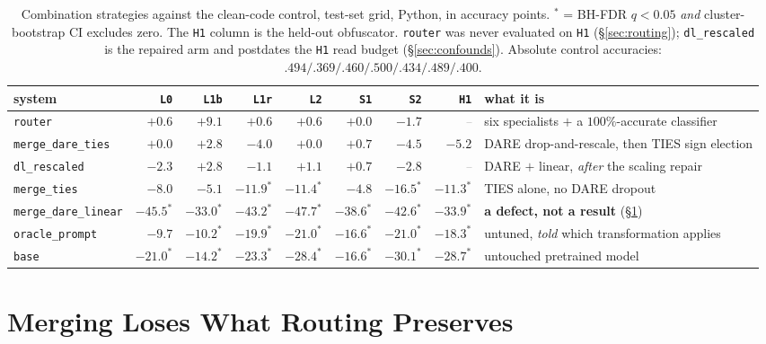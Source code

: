 \documentclass[sigconf,review,anonymous]{acmart}
\newcommand{\pending}{\textcolor{gray}{\textit{--}}}
\newcommand{\arm}[1]{\texttt{#1}}
\newcommand{\cond}[1]{\texttt{#1}}
\begin{document}
\begin{table}[t]
\caption{Combination strategies against the clean-code control, test-set grid, Python, in
accuracy points. $^{*}$ = BH-FDR $q<0.05$ \emph{and} cluster-bootstrap CI excludes zero. The
\cond{H1} column is the held-out obfuscator. \arm{router} was never evaluated on \cond{H1}
(\S\ref{sec:routing}); \arm{dl\_rescaled} is the repaired arm and postdates the \cond{H1} read
budget (\S\ref{sec:confounds}). Absolute control accuracies: $.494/.369/.460/.500/.434/.489/.400$.}
\label{tab:rq2}
\small
\begin{tabular}{@{}lrrrrrrrl@{}}
\toprule
system & \cond{L0} & \cond{L1b} & \cond{L1r} & \cond{L2} & \cond{S1} & \cond{S2} & \cond{H1} & what it is \\
\midrule
\arm{router}            & $+0.6$ & $+9.1$ & $+0.6$ & $+0.6$ & $+0.0$ & $-1.7$ & \pending & six specialists $+$ a $100\%$-accurate classifier \\
\arm{merge\_dare\_ties} & $+0.0$ & $+2.8$ & $-4.0$ & $+0.0$ & $+0.7$ & $-4.5$ & $-5.2$ & DARE drop-and-rescale, then TIES sign election \\
\arm{dl\_rescaled}      & $-2.3$ & $+2.8$ & $-1.1$ & $+1.1$ & $+0.7$ & $-2.8$ & \pending & DARE $+$ linear, \emph{after} the scaling repair \\
\arm{merge\_ties}       & $-8.0$ & $-5.1$ & $-11.9^{*}$ & $-11.4^{*}$ & $-4.8$ & $-16.5^{*}$ & $-11.3^{*}$ & TIES alone, no DARE dropout \\
\arm{merge\_dare\_linear} & $-45.5^{*}$ & $-33.0^{*}$ & $-43.2^{*}$ & $-47.7^{*}$ & $-38.6^{*}$ & $-42.6^{*}$ & $-33.9^{*}$ & \textbf{a defect, not a result} (\S\ref{sec:merging}) \\
\arm{oracle\_prompt}    & $-9.7$ & $-10.2^{*}$ & $-19.9^{*}$ & $-21.0^{*}$ & $-16.6^{*}$ & $-21.0^{*}$ & $-18.3^{*}$ & untuned, \emph{told} which transformation applies \\
\arm{base}              & $-21.0^{*}$ & $-14.2^{*}$ & $-23.3^{*}$ & $-28.4^{*}$ & $-16.6^{*}$ & $-30.1^{*}$ & $-28.7^{*}$ & untouched pretrained model \\
\bottomrule
\end{tabular}
\end{table}

\section{Merging Loses What Routing Preserves}
\label{sec:merging}
\end{document}
